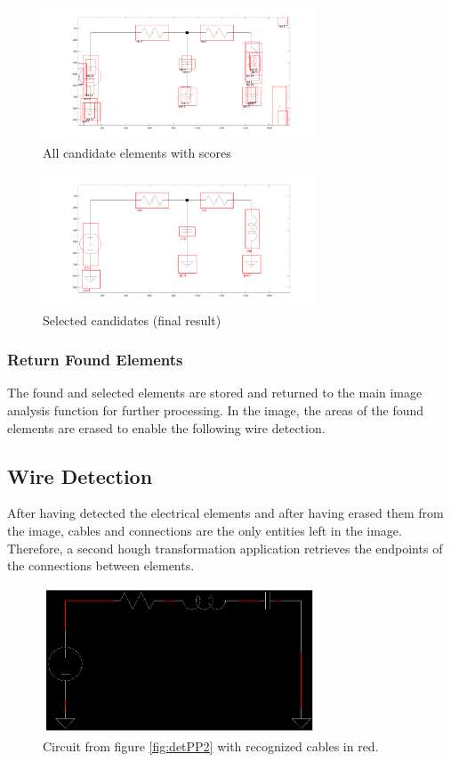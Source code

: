 \documentclass[10pt,twocolumn,letterpaper]{article}
\begin{document}
\begin{figure}[!ht]
\includegraphics[width = 3.2in]{img/detRS1.png}
\caption{All candidate elements with scores}
\label{fig:detRS1}
\end{figure}
\par

\begin{figure}[!ht]
\includegraphics[width = 3.2in]{img/detRS2.png}
\caption{Selected candidates (final result)}
\label{fig:detRS2}
\end{figure}

\subsubsection*{Return Found Elements}

The found and selected elements are stored and returned to the main image analysis function for further processing. In the image, the areas of the found elements are erased to enable the following wire detection.

\subsection{Wire Detection}
\label{subsec:wire}

After having detected the electrical elements and after having erased them from the image, cables and connections are the only entities left in the image. Therefore, a second hough transformation application retrieves the endpoints of the connections between elements.
\par

\begin{figure}[!ht]
\includegraphics[width = 3.2in]{img/connections_after.png}
\caption{Circuit from figure \ref{fig:detPP2} with recognized cables in red.}
\label{fig:c10}
\end{figure}
\end{document}
